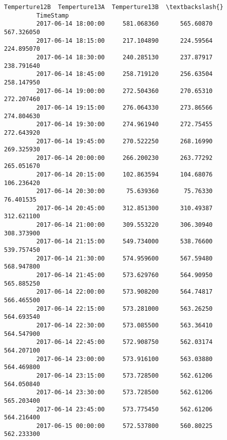 \documentclass[11pt]{article}
\begin{document}
\begin{Verbatim}[commandchars=\\\{\}]
                              Temperture12B  Temperture13A  Temperture13B  \textbackslash{}
         TimeStamp                                                          
         2017-06-14 18:00:00     581.068360      565.60870     567.326050   
         2017-06-14 18:15:00     217.104890      224.59564     224.895070   
         2017-06-14 18:30:00     240.285130      237.87917     238.791640   
         2017-06-14 18:45:00     258.719120      256.63504     258.147950   
         2017-06-14 19:00:00     272.504360      270.65310     272.207460   
         2017-06-14 19:15:00     276.064330      273.86566     274.804630   
         2017-06-14 19:30:00     274.961940      272.75455     272.643920   
         2017-06-14 19:45:00     270.522250      268.16990     269.325930   
         2017-06-14 20:00:00     266.200230      263.77292     265.051670   
         2017-06-14 20:15:00     102.863594      104.68076     106.236420   
         2017-06-14 20:30:00      75.639360       75.76330      76.401535   
         2017-06-14 20:45:00     312.851300      310.49387     312.621100   
         2017-06-14 21:00:00     309.553220      306.30940     308.373900   
         2017-06-14 21:15:00     549.734000      538.76600     539.757450   
         2017-06-14 21:30:00     574.959600      567.59480     568.947800   
         2017-06-14 21:45:00     573.629760      564.90950     565.885250   
         2017-06-14 22:00:00     573.908200      564.74817     566.465500   
         2017-06-14 22:15:00     573.281000      563.26250     564.693540   
         2017-06-14 22:30:00     573.085500      563.36410     564.547900   
         2017-06-14 22:45:00     572.908750      562.03174     564.207100   
         2017-06-14 23:00:00     573.916100      563.03880     564.469800   
         2017-06-14 23:15:00     573.728500      562.61206     564.050840   
         2017-06-14 23:30:00     573.728500      562.61206     565.203400   
         2017-06-14 23:45:00     573.775450      562.61206     564.216400   
         2017-06-15 00:00:00     572.537800      560.80225     562.233300   
         

\end{Verbatim}
\end{document}
